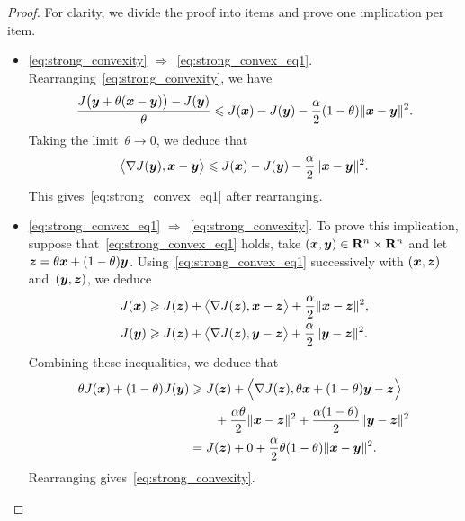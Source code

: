 \begin{proof}
    For clarity, we divide the proof into items and prove one implication per item.
    \begin{itemize}
        \item
            \eqref{eq:strong_convexity} $\Rightarrow$~\eqref{eq:strong_convex_eq1}.
            Rearranging~\eqref{eq:strong_convexity}, we have
            \[
                \frac{J\bigl( \vect y + \theta (\vect x - \vect y) \bigr) - J(\vect y)}{\theta}
                \leq  J(\vect x)  - J(\vect y)  - \frac{\alpha}{2} (1 - \theta) \norm{\vect x - \vect y}^2.
            \]
            Taking the limit~$\theta \to 0$,
            we deduce that
            \[
                \ip[\big]{\nabla J(\vect y), \vect x - \vect y}
                \leq  J(\vect x)  - J(\vect y)  - \frac{\alpha}{2}  \norm{\vect x - \vect y}^2.
            \]
            This gives~\eqref{eq:strong_convex_eq1} after rearranging.

    \item
        \eqref{eq:strong_convex_eq1} $\Rightarrow$~\eqref{eq:strong_convexity}.
        To prove this implication, suppose that~\eqref{eq:strong_convex_eq1} holds,
        take $(\vect x, \vect y) \in \real^n \times \real^n$
        and let $\vect z = \theta \vect x + (1 - \theta) \vect y$.
        Using~\eqref{eq:strong_convex_eq1} successively with $(\vect x, \vect z)$ and~$(\vect y, \vect z)$,
        we deduce
        \begin{align*}
            J(\vect x) &\geq J(\vect z) + \ip[\big]{\nabla J(\vect z), \vect x - \vect z} + \frac{\alpha}{2} \norm{\vect x - \vect z}^2, \\
            J(\vect y) &\geq J(\vect z) + \ip[\big]{\nabla J(\vect z), \vect y - \vect z} + \frac{\alpha}{2} \norm{\vect y - \vect z}^2.
        \end{align*}
        Combining these inequalities,
        we deduce that
        \begin{align*}
            \theta J(\vect x) + (1 - \theta) J(\vect y)
            &\geq J(\vect z) + \ip[\Big]{\nabla J(\vect z), \theta \vect x + (1 - \theta) \vect y - \vect z} \\
            &\qquad + \frac{\alpha \theta}{2} \norm{\vect x - \vect z}^2 + \frac{\alpha(1 - \theta)}{2}  \norm{\vect y - \vect z}^2 \\
            &= J(\vect z) + 0 + \frac{\alpha}{2} \theta (1-\theta) \norm{\vect x - \vect y}^2.
        \end{align*}
        Rearranging gives~\eqref{eq:strong_convexity}.


\end{itemize}
\end{proof}
